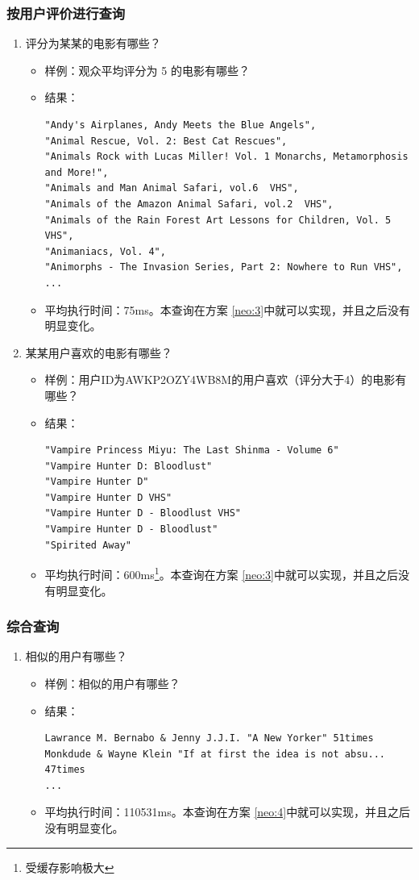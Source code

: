 \documentclass{ctexrep}
\begin{document}
	\subsubsection{按用户评价进行查询}
		\begin{enumerate}
		\item 评分为某某的电影有哪些？\begin{itemize}
			\item 样例：观众平均评分为 5 的电影有哪些？
			\item 结果：\begin{lstlisting}
"Andy's Airplanes, Andy Meets the Blue Angels",
"Animal Rescue, Vol. 2: Best Cat Rescues",
"Animals Rock with Lucas Miller! Vol. 1 Monarchs, Metamorphosis and More!",
"Animals and Man Animal Safari, vol.6  VHS",
"Animals of the Amazon Animal Safari, vol.2  VHS",
"Animals of the Rain Forest Art Lessons for Children, Vol. 5  VHS",
"Animaniacs, Vol. 4",
"Animorphs - The Invasion Series, Part 2: Nowhere to Run VHS",
...
			\end{lstlisting}
			\item 平均执行时间：75ms。本查询在方案 \ref{neo:3}中就可以实现，并且之后没有明显变化。
		\end{itemize}
		\item 某某用户喜欢的电影有哪些？\begin{itemize}
			\item 样例：用户ID为AWKP2OZY4WB8M的用户喜欢（评分大于4）的电影有哪些？
			\item 结果：\begin{lstlisting}
"Vampire Princess Miyu: The Last Shinma - Volume 6"
"Vampire Hunter D: Bloodlust"
"Vampire Hunter D"
"Vampire Hunter D VHS"
"Vampire Hunter D - Bloodlust VHS"
"Vampire Hunter D - Bloodlust"
"Spirited Away"
			\end{lstlisting}
			\item 平均执行时间：600ms\footnote{受缓存影响极大}。本查询在方案 \ref{neo:3}中就可以实现，并且之后没有明显变化。
		\end{itemize}
	\end{enumerate}
	\subsubsection{综合查询}
		\begin{enumerate}
		\item 相似的用户有哪些？\begin{itemize}
			\item 样例：相似的用户有哪些？
			\item 结果：\begin{lstlisting}
Lawrance M. Bernabo & Jenny J.J.I. "A New Yorker" 51times
Monkdude & Wayne Klein "If at first the idea is not absu... 47times
...
			\end{lstlisting}
			\item 平均执行时间：110531ms。本查询在方案 \ref{neo:4}中就可以实现，并且之后没有明显变化。
		\end{itemize}
	\end{enumerate}
\end{document}
